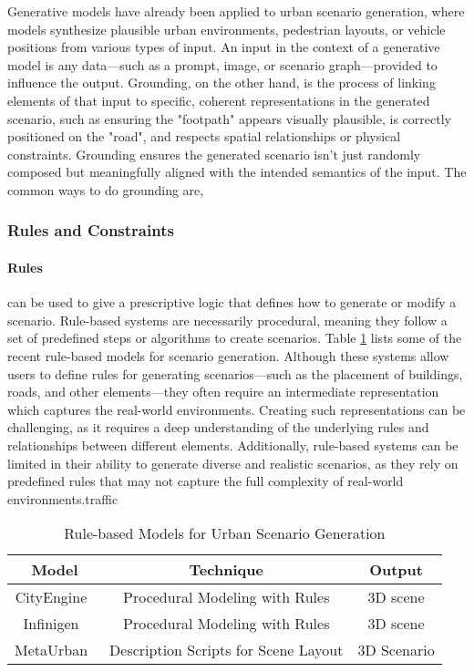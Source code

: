 \documentclass{article}
\begin{document}
Generative models have already been applied to urban scenario generation, where models synthesize plausible urban environments, pedestrian layouts, or vehicle positions from various types of input. An input in the context of a generative model is any data—such as a prompt, image, or scenario graph—provided to influence the output. Grounding, on the other hand, is the process of linking elements of that input to specific, coherent representations in the generated scenario, such as ensuring the "footpath" appears visually plausible, is correctly positioned on the "road", and respects spatial relationships or physical constraints. Grounding ensures the generated scenario isn't just randomly composed but meaningfully aligned with the intended semantics of the input. The common ways to do grounding are,

\subsubsection{Rules and Constraints}

\paragraph{Rules} can be used to give a prescriptive logic that defines how to generate or modify a scenario. Rule-based systems are necessarily procedural, meaning they follow a set of predefined steps or algorithms to create scenarios. Table \ref{tab:rule_based_models} lists some of the recent rule-based models for scenario generation. Although these systems allow users to define rules for generating scenarios—such as the placement of buildings, roads, and other elements—they often require an intermediate representation which captures the real-world environments. Creating such representations can be challenging, as it requires a deep understanding of the underlying rules and relationships between different elements. Additionally, rule-based systems can be limited in their ability to generate diverse and realistic scenarios, as they rely on predefined rules that may not capture the full complexity of real-world environments.traffic

\begin{table}[ht]
\centering
    \begin{tabular}{|c|c|c|}
    \hline
    \textbf{Model} & \textbf{Technique} & \textbf{Output} \\ \hline
    CityEngine~\cite{parish2001procedural} & Procedural Modeling with Rules & 3D scene \\ \hline
    Infinigen~\cite{raistrick2023infinite} & Procedural Modeling with Rules & 3D scene \\ \hline
    MetaUrban~\cite{wu2024metaurban} & Description Scripts for Scene Layout & 3D Scenario \\ \hline    
    \end{tabular}
\caption{Rule-based Models for Urban Scenario Generation}
\label{tab:rule_based_models}
\end{table}
\end{document}
